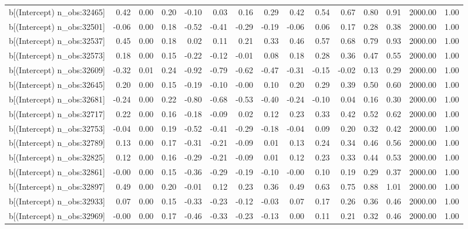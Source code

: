 \begin{table}[ht]
\begin{tabular}{rrrrrrrrrrrrrrr}
  b[(Intercept) n\_obs:32465] & 0.42 & 0.00 & 0.20 & -0.10 & 0.03 & 0.16 & 0.29 & 0.42 & 0.54 & 0.67 & 0.80 & 0.91 & 2000.00 & 1.00 \\ 
  b[(Intercept) n\_obs:32501] & -0.06 & 0.00 & 0.18 & -0.52 & -0.41 & -0.29 & -0.19 & -0.06 & 0.06 & 0.17 & 0.28 & 0.38 & 2000.00 & 1.00 \\ 
  b[(Intercept) n\_obs:32537] & 0.45 & 0.00 & 0.18 & 0.02 & 0.11 & 0.21 & 0.33 & 0.46 & 0.57 & 0.68 & 0.79 & 0.93 & 2000.00 & 1.00 \\ 
  b[(Intercept) n\_obs:32573] & 0.18 & 0.00 & 0.15 & -0.22 & -0.12 & -0.01 & 0.08 & 0.18 & 0.28 & 0.36 & 0.47 & 0.55 & 2000.00 & 1.00 \\ 
  b[(Intercept) n\_obs:32609] & -0.32 & 0.01 & 0.24 & -0.92 & -0.79 & -0.62 & -0.47 & -0.31 & -0.15 & -0.02 & 0.13 & 0.29 & 2000.00 & 1.00 \\ 
  b[(Intercept) n\_obs:32645] & 0.20 & 0.00 & 0.15 & -0.19 & -0.10 & -0.00 & 0.10 & 0.20 & 0.29 & 0.39 & 0.50 & 0.60 & 2000.00 & 1.00 \\ 
  b[(Intercept) n\_obs:32681] & -0.24 & 0.00 & 0.22 & -0.80 & -0.68 & -0.53 & -0.40 & -0.24 & -0.10 & 0.04 & 0.16 & 0.30 & 2000.00 & 1.00 \\ 
  b[(Intercept) n\_obs:32717] & 0.22 & 0.00 & 0.16 & -0.18 & -0.09 & 0.02 & 0.12 & 0.23 & 0.33 & 0.42 & 0.52 & 0.62 & 2000.00 & 1.00 \\ 
  b[(Intercept) n\_obs:32753] & -0.04 & 0.00 & 0.19 & -0.52 & -0.41 & -0.29 & -0.18 & -0.04 & 0.09 & 0.20 & 0.32 & 0.42 & 2000.00 & 1.00 \\ 
  b[(Intercept) n\_obs:32789] & 0.13 & 0.00 & 0.17 & -0.31 & -0.21 & -0.09 & 0.01 & 0.13 & 0.24 & 0.34 & 0.46 & 0.56 & 2000.00 & 1.00 \\ 
  b[(Intercept) n\_obs:32825] & 0.12 & 0.00 & 0.16 & -0.29 & -0.21 & -0.09 & 0.01 & 0.12 & 0.23 & 0.33 & 0.44 & 0.53 & 2000.00 & 1.00 \\ 
  b[(Intercept) n\_obs:32861] & -0.00 & 0.00 & 0.15 & -0.36 & -0.29 & -0.19 & -0.10 & -0.00 & 0.10 & 0.19 & 0.29 & 0.37 & 2000.00 & 1.00 \\ 
  b[(Intercept) n\_obs:32897] & 0.49 & 0.00 & 0.20 & -0.01 & 0.12 & 0.23 & 0.36 & 0.49 & 0.63 & 0.75 & 0.88 & 1.01 & 2000.00 & 1.00 \\ 
  b[(Intercept) n\_obs:32933] & 0.07 & 0.00 & 0.15 & -0.33 & -0.23 & -0.12 & -0.03 & 0.07 & 0.17 & 0.26 & 0.36 & 0.46 & 2000.00 & 1.00 \\ 
  b[(Intercept) n\_obs:32969] & -0.00 & 0.00 & 0.17 & -0.46 & -0.33 & -0.23 & -0.13 & 0.00 & 0.11 & 0.21 & 0.32 & 0.46 & 2000.00 & 1.00 \\ 

\end{tabular}
\end{table}
